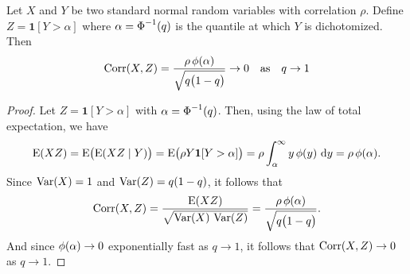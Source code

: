 \begin{theorem}
  Let \(X\) and \(Y\) be two standard normal random variables with correlation \(\rho\).
  Define \(Z = \bm{1}[Y > \alpha]\) where \(\alpha = \operatorname{\Phi}^{-1}(q)\) is the
  quantile at which \(Y\) is dichotomized.
  Then
  \[
    \operatorname{Corr}(X,Z)
    = \frac{\rho\operatorname{\phi}(\alpha)}{\sqrt{q \bigl(1 - q\bigr)}} \rightarrow 0 \quad\text{as}\quad q \rightarrow 1
  \]
\end{theorem}
\begin{proof}
  Let \(Z = \mathbf{1}[Y > \alpha]\) with \(\alpha = \operatorname{\Phi}^{-1}(q)\). Then,
  using the law of total expectation, we have
  \[
    \operatorname{E}(XZ) = \operatorname{E}\bigl(\operatorname{E}(XZ \mid Y)\bigr) = \operatorname{E}\bigl(\rho Y \bm{1}[Y > \alpha]\bigr)
    = \rho \int_{\alpha}^{\infty} y \operatorname{\phi}(y)\,\mathop{}\!\mathrm{d} y = \rho \operatorname{\phi}(\alpha).
  \]
  Since \(\operatorname{Var}(X) = 1\) and \(\operatorname{Var}(Z) = q (1 - q)\), it follows that
  \[
    \operatorname{Corr}(X,Z) = \frac{\operatorname{E}(XZ)}{\sqrt{\operatorname{Var}(X)\,\operatorname{Var}(Z)}} = \frac{\rho \operatorname{\phi}(\alpha)}{\sqrt{q \bigl(1 - q\bigr)}}.
  \]
  And since \(\operatorname{\phi}(\alpha) \to 0\) exponentially fast as \(q \to 1\), it follows that
  \(\operatorname{Corr}(X,Z) \to 0\) as \(q \to 1\).
\end{proof}
